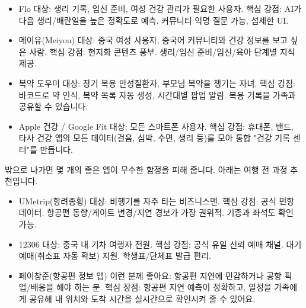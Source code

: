 
\begin{itemize}
  \item Flo 대상: 생리 기록, 임신 준비, 여성 건강 관리가 필요한 사용자. 핵심 강점: AI가 다음 생리/배란일을 높은 정확도로 예측. 커뮤니티 익명 질문 가능, 섬세한 UI.
  \item 메이유(Meiyou) 대상: 중국 여성 사용자, 중국어 커뮤니티와 건강 정보를 보고 싶은 사람. 핵심 강점: 현지화 콘텐츠 풍부. 생리/임신 준비/임신/육아 단계별 지식 제공.
\end{itemize}


\begin{itemize}
  \item 복약 도우미 대상: 장기 복용 만성질환자, 부모님 복약을 챙기는 자녀. 핵심 강점: 바코드로 약 인식, 복약 목록 자동 생성, 시간대별 팝업 알림. 복용 기록을 가족과 공유할 수 있습니다.
\end{itemize}


\begin{itemize}
  \item Apple 건강 / Google Fit 대상: 모든 스마트폰 사용자. 핵심 강점: 휴대폰, 밴드, 타사 건강 앱의 모든 데이터(걸음, 심박, 수면, 생리 등)를 모아 통합 "건강 기록 센터"를 만듭니다.
\end{itemize}


밖으로 나가면 몇 개의 좋은 앱이 무수한 함정을 피해 줍니다. 아래는 여행 전 과정 추천입니다.


\begin{itemize}
  \item UMetrip(항려종횡) 대상: 비행기를 자주 타는 비즈니스맨. 핵심 강점: 공식 민항 데이터. 항공편 동향/게이트 변경/지연 경보가 가장 권위적. 기종과 좌석도 확인 가능.
  \item 12306 대상: 중국 내 기차 여행자 전원. 핵심 강점: 공식 유일 신뢰 예매 채널. 대기 예매(취소표 자동 확보) 지원. 학생표/단체표 발급 편리.
  \item 페이창준(항공편 정보 앱) 이런 분께 좋아요: 항공편 지연에 민감하거나 공항 픽업/배웅을 해야 하는 분. 핵심 장점: 항공편 지연 예측이 정확하고, 일정을 가족에게 공유해 내 위치와 도착 시간을 실시간으로 확인시켜 줄 수 있어요.
\end{itemize}


